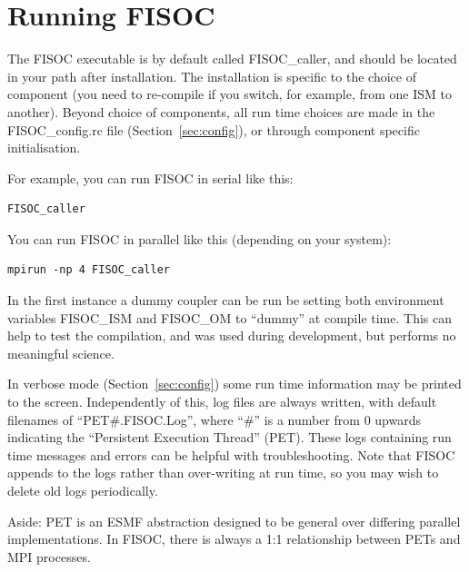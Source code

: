 \documentclass[12pt]{article}
\begin{document}









\section{Running FISOC}
\label{sec:FISOC_SUG}

The FISOC executable is by default called FISOC\_caller, and should be located in your 
path after installation. 
The installation is specific to the choice of component (you need to re-compile if you switch, for 
example, from one ISM to another).  
Beyond choice of components, all run time choices are made in the FISOC\_config.rc file
(Section~\ref{sec:config}), 
or through component specific initialisation.

For example, you can run FISOC in serial like this:
\begin{lstlisting}
FISOC_caller
\end{lstlisting}
You can run FISOC in parallel like this (depending on your system):
\begin{lstlisting}
mpirun -np 4 FISOC_caller
\end{lstlisting}

In the first instance a dummy coupler can be run be setting both environment variables FISOC\_ISM and 
FISOC\_OM to ``dummy'' at compile time.  This can help to test the compilation, and was used during development, 
but performs no meaningful science.  

In verbose mode (Section~\ref{sec:config}) some run time information may be printed to the screen.  
Independently of this, log files are always written, 
with default filenames of ``PET\#.FISOC.Log'', where ``\#'' is a number from 0 upwards indicating the 
``Persistent Execution Thread'' (PET). 
These logs containing run time messages and errors can be helpful with troubleshooting.
Note that FISOC appends to the logs rather than over-writing at run time, so you may wish to delete old logs 
periodically. 

Aside: PET is an ESMF abstraction designed to be general over differing parallel implementations. 
In FISOC, there is always a 1:1 relationship between PETs and MPI processes. 
\end{document}
